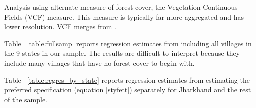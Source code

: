 \documentclass[12pt,reqno]{article}
\begin{document}
\begin{refsection}
\begin{table}[htbp!] \centering
  \label{table:vcf_estimates}
  \caption{Analysis using alternate measure of forest cover, the Vegetation Continuous Fields (VCF) measure. This measure is typically far more aggregated and has lower resolution. VCF merges from \textcite{almn2020}.}

\end{table}

%   


%   

Table ~\ref{table:fullsamp} reports regression estimates from including all villages in the 9 states in our sample. The results are difficult to interpret because they include many villages that have no forest cover to begin with.




\pagebreak
Table ~\ref{table:regres_by_state} reports regression estimates from estimating the preferred specification (equation \ref{styfett}) separately for Jharkhand and the rest of the sample. %









\end{refsection}
\end{document}
